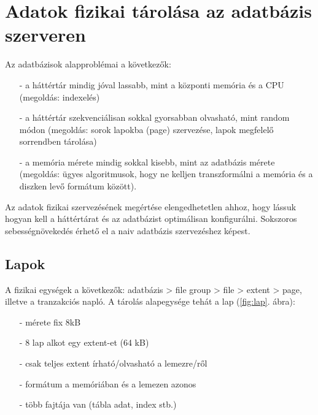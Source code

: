 \documentclass[12pt]{article}
\theoremstyle{plain}
\begin{document}
\section{Adatok fizikai tárolása az adatbázis szerveren}

Az adatbázisok alapproblémai a következők:
\begin{itemize}
    \item[-] a háttértár mindig jóval lassabb, mint a központi memória és a CPU (megoldás: indexelés)
    \item[-] a háttértár szekvenciálisan sokkal gyorsabban olvasható, mint random módon
    (megoldás: sorok lapokba (page) szervezése, lapok megfelelő sorrendben tárolása)
    \item[-] a memória mérete mindig sokkal kisebb, mint az adatbázis mérete (megoldás: ügyes algoritmusok, hogy ne kelljen transzformálni a memória és a diszken levő formátum között). 
\end{itemize}{}
Az adatok fizikai szervezésének megértése elengedhetetlen ahhoz, hogy lássuk hogyan kell a háttértárat és az adatbázist optimálisan konfigurálni. Sokszoros sebességnövekedés érhető el a naiv adatbázis szervezéshez képest.
\\
\subsection{Lapok}
A fizikai egységek a következők: adatbázis > file group > file > extent > page, illetve a tranzakciós napló. A tárolás alapegysége tehát a lap (\ref{fig:lap}. ábra):
\begin{itemize}
    \item[-] mérete fix 8kB
    \item[-] 8 lap alkot egy extent-et (64 kB)
    \item[-] csak teljes extent írható/olvasható a lemezre/ről
    \item[-] formátum a memóriában és a lemezen azonos
    \item[-] több fajtája van (tábla adat, index stb.)
\end{itemize}{}
\end{document}
